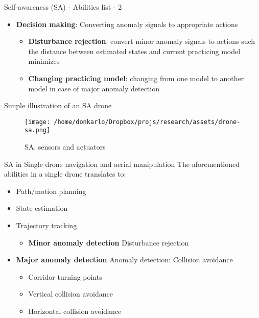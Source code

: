 \documentclass[unknownkeysallowed]{beamer}
\begin{document}
	\begin{frame}{Self-awareness (SA) - Abilities list - 2}
		\begin{itemize}
			\item \textbf{Decision making}: Converting anomaly signals to appropriate actions
			\begin{itemize}
				\item \textbf{Disturbance rejection}: convert minor anomaly signals to actions such the distance between estimated states and current practicing model minimizes
				\item \textbf{Changing practicing model}: changing from one model to another model in case of major anomaly detection
			\end{itemize}
		\end{itemize}
	\end{frame}

	\begin{frame}{Simple illustration of an SA drone}
		\begin{figure}
			\texttt{[image: /home/donkarlo/Dropbox/projs/research/assets/drone-sa.png]}
			\caption{SA, sensors and actuators}
		\end{figure}
	\end{frame}

	\begin{frame}{SA in Single drone navigation and aerial manipulation}
		The aforementioned abilities in a single drone translates to:
		\begin{itemize}
			\item Path/motion planning
			\item State estimation
			\item Trajectory tracking
				\begin{itemize}
					\item \textbf{Minor anomaly detection} Disturbance rejection
				\end{itemize}
			\item \textbf{Major anomaly detection}  Anomaly detection: Collision avoidance
				\begin{itemize}
					\item Corridor turning points
					\item Vertical collision avoidance
					\item Horizontal collision avoidance
				\end{itemize}
		\end{itemize}
	\end{frame}
\end{document}
